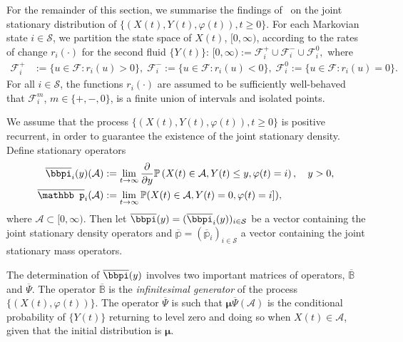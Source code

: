 For the remainder of this section, we summarise the findings of~\citep{bo2014} on the joint stationary distribution of $\{(X(t), Y(t), \varphi(t)),t \geq 0\}$. For each Markovian state $i \in \mathcal{S}$, we partition the state space of \(X(t)\), \([0,\infty)\), according to the rates of change $r_i(\cdot)$ for the second fluid $\{Y(t)\}$: $[0,\infty) := \mathcal{F}^{+}_i \cup \mathcal{F}^{-}_i \cup \mathcal{F}^{0}_i,$  
where 
% 
		\begin{align} 
			\mathcal{F}^{+}_i & := \{u \in \mathcal{F} : r_i(u) > 0\},  \;
			\mathcal{F}^{-}_i :=  \{u \in \mathcal{F}:  r_i(u) < 0\}, \;
			\mathcal{F}^{0}_i := \{u \in \mathcal{F}: r_i(u) = 0\}.\label{eqn:fil}
		\end{align} 
% 
For all $i \in \mathcal{S}$, the functions $r_i(\cdot)$ are assumed to be sufficiently well-behaved that $\mathcal{F}^{m}_i$, $m \in \{+, -, 0\}$, is a finite union of intervals and isolated points. 

We assume that the process $\{(X(t), Y(t), \varphi(t)),t\geq 0\}$ is positive recurrent, in order to guarantee the existence of the joint stationary density. Define stationary operators 
\begin{align} 
		\label{eqn:jointpi} 
	\overline \bbpi_i(y)(\mathcal{A}) & := \lim_{t \rightarrow \infty} \frac{\partial}{\partial y} \mathbb{P}\left(X(t) \in \mathcal{A}, Y(t) \leq y, \varphi(t) = i\right), \quad y>0,\\
% 
		\label{eqn:jointmass}
		\overline{\mathbb p}_i(\mathcal{A}) & := \lim_{t \rightarrow \infty}  \mathbb{P}(X(t) \in \mathcal{A}, Y(t) = 0, \varphi(t) = i]),
	\end{align} 
	where $\mathcal{A} \subset [0,\infty)$.
Then let $\overline{{\bbpi}}(y) = (\overline \bbpi_i(y))_{i \in \mathcal{S}}$ be a vector containing the joint stationary density operators and $\overline{\mathbb{p}} = (\overline{\mathbb p}_i)_{i \in \mathcal{S}}$ a vector containing the joint stationary mass operators.

	
The determination of $\overline{{\bbpi}}(y)$ involves two important matrices of operators, $\overline{\mathbb B}$ and $\overline{\mathbb \Psi}$. The operator \(\overline{\mathbb B}\) is the \textit{infinitesimal generator} of the process \(\{(X(t),\varphi(t))\}\). %
The operator \(\overline{\mathbb \Psi}\) is such that $\boldsymbol{\mu} \overline{\mathbb \Psi} (\mathcal{A})$ is the conditional probability of $\{Y(t)\}$ returning to level zero and doing so when $X(t) \in \mathcal{A}$, given that the initial distribution is $\boldsymbol{\mu}$.


